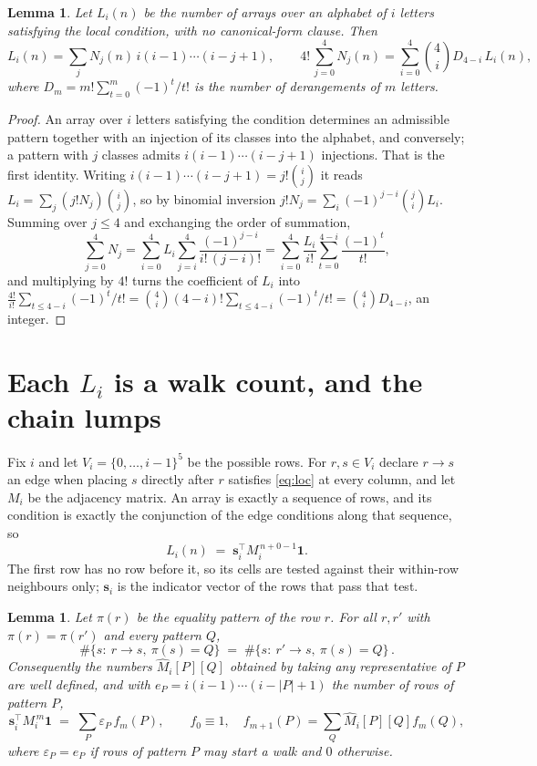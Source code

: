 \documentclass[11pt,a4paper]{article}
\theoremstyle{plain}
\newtheorem{lemma}[theorem]{Lemma}
\theoremstyle{definition}
\begin{document}
\begin{lemma}\label{lem:inv}
Let $L_i(n)$ be the number of arrays over an alphabet of $i$ letters satisfying the local
condition, with no canonical-form clause. Then
\[
L_i(n)=\sum_j N_j(n)\,i(i-1)\cdots(i-j+1),
\qquad
4!\,\sum_{j=0}^{4}N_j(n)=\sum_{i=0}^{4}\binom{4}{i}D_{4-i}\,L_i(n),
\]
where $D_m=m!\sum_{t=0}^{m}(-1)^t/t!$ is the number of derangements of $m$ letters.
\end{lemma}

\begin{proof}
An array over $i$ letters satisfying the condition determines an admissible pattern together
with an injection of its classes into the alphabet, and conversely; a pattern with $j$
classes admits $i(i-1)\cdots(i-j+1)$ injections. That is the first identity. Writing
$i(i-1)\cdots(i-j+1)=j!\binom{i}{j}$ it reads $L_i=\sum_j (j!N_j)\binom{i}{j}$, so by
binomial inversion $j!N_j=\sum_{i}(-1)^{j-i}\binom{j}{i}L_i$. Summing over
$j\le 4$ and exchanging the order of summation,
\[
\sum_{j=0}^{4}N_j=\sum_{i=0}^{4}L_i\sum_{j=i}^{4}\frac{(-1)^{j-i}}{i!\,(j-i)!}
=\sum_{i=0}^{4}\frac{L_i}{i!}\sum_{t=0}^{4-i}\frac{(-1)^t}{t!} ,
\]
and multiplying by $4!$ turns the coefficient of $L_i$ into
$\frac{4!}{i!}\sum_{t\le 4-i}(-1)^t/t!=\binom{4}{i}(4-i)!\sum_{t\le 4-i}(-1)^t/t!
=\binom{4}{i}D_{4-i}$, an integer.
\end{proof}

\section{Each $L_i$ is a walk count, and the chain lumps}

Fix $i$ and let $V_i=\{0,\dots,i-1\}^{5}$ be the possible rows. For $r,s\in V_i$
declare $r\to s$ an edge when placing $s$ directly after $r$ satisfies \eqref{eq:loc} at
every column, and let $M_i$ be the adjacency matrix. An array is exactly a sequence of
rows, and its condition is exactly the conjunction of the edge conditions along that
sequence, so
\[
L_i(n)\;=\;\mathbf{s}_i^{\!\top}M_i^{\,n+0-1}\mathbf{1} .
\]
The first row has no row before it, so its cells are tested
against their within-row neighbours only; $\mathbf{s}_i$ is the indicator vector of the
rows that pass that test.

\begin{lemma}\label{lem:lump}
Let $\pi(r)$ be the equality pattern of the row $r$. For all $r,r'$ with
$\pi(r)=\pi(r')$ and every pattern $Q$,
\[
\#\{s:\ r\to s,\ \pi(s)=Q\}\;=\;\#\{s:\ r'\to s,\ \pi(s)=Q\}\, .
\]
Consequently the numbers $\widehat M_i[P][Q]$ obtained by taking any representative of $P$
are well defined, and with $e_P=i(i-1)\cdots(i-|P|+1)$ the number of rows of pattern $P$,
\[
\mathbf{s}_i^{\!\top}M_i^{\,m}\mathbf{1}\;=\;\sum_P \varepsilon_P\,f_m(P),
\qquad f_0\equiv1,\quad f_{m+1}(P)=\sum_Q\widehat M_i[P][Q]f_m(Q),
\]
where $\varepsilon_P=e_P$ if rows of pattern $P$ may start a walk and $0$ otherwise.
\end{lemma}
\end{document}
